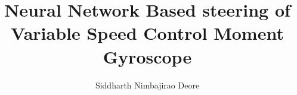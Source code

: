 \documentclass[oneside,LaM,binding=0.0cm]{sapthesis}
\title{Neural Network Based steering of \\ Variable Speed Control Moment Gyroscope}
\author{Siddharth Nimbajirao Deore}
\begin{document}
\frontmatter
\maketitle

\begin{comment}
\dedication{Dedicated to\\ Aai and Aaba}

\begin{abstract}
\phantomsection
\addcontentsline{toc}{chapter}{Abstract}
This document is an example which shows the main features of
the \LaTeXe\ class \texttt{sapthesis.cls} developed by Siddharth Nimbajirao Deore
with the help of GuIT (Gruppo Utilizzatori Italiani di \TeX).
\end{abstract}

\begin{acknowledgments}
\phantomsection
\addcontentsline{toc}{chapter}{Acknowledgments}
Sab ki dua
\end{acknowledgments}

\newglossaryentry{policy}{
    name = policy,
    description = neural network which produces appropriate actions.
}



\renewcommand{\contentsname}{Table of Contents}
\tableofcontents

\listoftables
\addcontentsline{toc}{chapter}{\listtablename}

\listoffigures
\addcontentsline{toc}{chapter}{\listfigurename}

\printglossary[type=\acronymtype, title=List of Acronyms]
\addcontentsline{toc}{chapter}{List of Acronyms}

\printglossary[title=List of Terms]
\addcontentsline{toc}{chapter}{List of Terms}
\end{comment}
\end{document}
